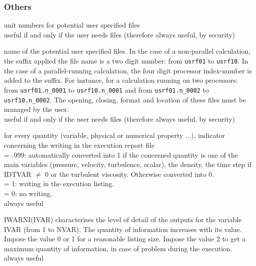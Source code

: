 \subsubsection{Others}

{unit numbers for potential user specified files\\
useful if and only if the user needs files (therefore always useful, by security)}

{name of the potential user specified files. In the case of a non-parallel
calculation, the suffix applied the file name is a two digit number:
from \texttt{usrf01} to \texttt{usrf10}. In the case of a
parallel-running calculation, the four digit processor index-number is
added to the suffix. For instance, for a calculation running on two
processors: from \texttt{usrf01.n\_0001} to \texttt{usrf10.n\_0001} and
from \texttt{usrf01.n\_0002} to \texttt{usrf10.n\_0002}. The opening,
closing, format and location of these files must be managed by the user.\\
useful if and only if the user needs files (therefore always useful, by security)}

{for every quantity (variable, physical or numerical property ...),
indicator concerning the writing in the execution report file \\
\hspace*{1.3cm}= -999: automatically converted into 1 if the concerned
quantity is one of the main variables (pressure, velocity, turbulence,
scalar), the density, the time step if IDTVAR $\ne$ 0 or the turbulent
viscosity. Otherwise converted into 0.\\
\hspace*{1.3cm}= 1: writing in the execution listing.\\
\hspace*{1.3cm}= 0: no writing.\\
always useful}

{IWARNI(IVAR) characterises the level of detail of the outputs for the
variable IVAR (from 1 to NVAR). The quantity of information increases with
its value.\\
Impose the value 0 or 1 for a reasonable listing size. Impose the value 2
to get a maximum quantity of information, in case of problem during the
execution.\\
always useful}

